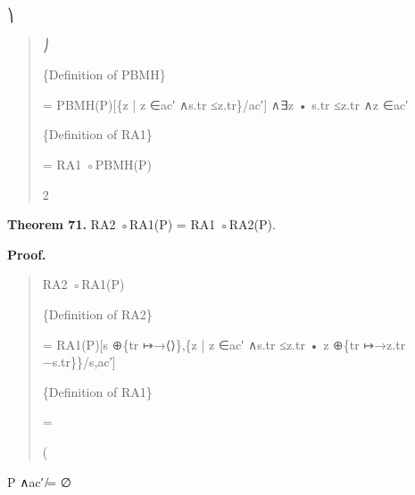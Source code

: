 \documentclass[11pt]{article}
\begin{document}
⎞

\begin{quote}\small\raggedright
⎠
\par
\{Definition of PBMH\}
\par
= PBMH(P)[\{z | z ∈ac′ ∧s.tr ≤z.tr\}/ac′] ∧∃z • s.tr ≤z.tr ∧z ∈ac′
\par
\{Definition of RA1\}
\par
= RA1 ◦PBMH(P)
\par
2
\end{quote}

\noindent\textbf{Theorem 71.} RA2 ◦RA1(P) = RA1 ◦RA2(P).


\noindent\textbf{Proof.}


\begin{quote}\small\raggedright
RA2 ◦RA1(P)
\par
\{Definition of RA2\}
\par
= RA1(P)[s ⊕\{tr ↦→⟨⟩\},\{z | z ∈ac′ ∧s.tr ≤z.tr • z ⊕\{tr ↦→z.tr −s.tr\}\}/s,ac′]
\par
\{Definition of RA1\}
\par
=
\par
(
\end{quote}

P ∧ac′ ̸= ∅
\end{document}
